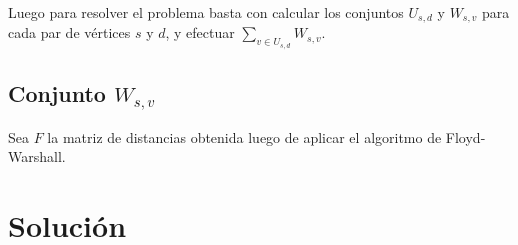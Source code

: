 \documentclass{article}
\begin{document}
Luego para resolver el problema basta con calcular los conjuntos $U_{s,d}$ y $W_{s,v}$ para cada
par de vértices $s$ y $d$, y efectuar $\sum_{v \in U_{s,d}}W_{s,v}$.

\subsection*{Conjunto $W_{s,v}$}
Sea $F$ la matriz de distancias obtenida luego de aplicar el algoritmo de Floyd-Warshall. 


\section*{Solución}
\end{document}
